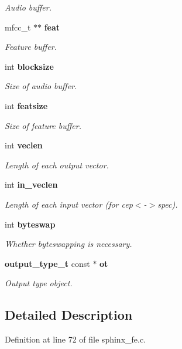 \begin{DoxyCompactItemize}
\begin{DoxyCompactList}\small\item\em Audio buffer. \end{DoxyCompactList}\item 
mfcc\+\_\+t $\ast$$\ast$ \textbf{ feat}
\begin{DoxyCompactList}\small\item\em Feature buffer. \end{DoxyCompactList}\item 
int \textbf{ blocksize}
\begin{DoxyCompactList}\small\item\em Size of audio buffer. \end{DoxyCompactList}\item 
int \textbf{ featsize}
\begin{DoxyCompactList}\small\item\em Size of feature buffer. \end{DoxyCompactList}\item 
int \textbf{ veclen}
\begin{DoxyCompactList}\small\item\em Length of each output vector. \end{DoxyCompactList}\item 
int \textbf{ in\+\_\+veclen}
\begin{DoxyCompactList}\small\item\em Length of each input vector (for cep$<$-\/$>$spec). \end{DoxyCompactList}\item 
int \textbf{ byteswap}
\begin{DoxyCompactList}\small\item\em Whether byteswapping is necessary. \end{DoxyCompactList}\item 
\textbf{ output\+\_\+type\+\_\+t} const  $\ast$ \textbf{ ot}
\begin{DoxyCompactList}\small\item\em Output type object. \end{DoxyCompactList}\end{DoxyCompactItemize}


\subsection{Detailed Description}


Definition at line 72 of file sphinx\+\_\+fe.\+c.



